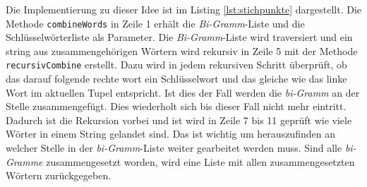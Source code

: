 Die Implementierung zu dieser Idee ist im Listing \ref{lst:stichpunkte} dargestellt. Die Methode \lstinline{combineWords} in Zeile 1 erhält die \emph{Bi-Gramm}-Liste und die Schlüsselwörterliste als Parameter. Die \emph{Bi-Gramm}-Liste wird traversiert und ein string aus zusammengehörigen Wörtern wird rekursiv in Zeile 5 mit der Methode \lstinline{recursivCombine} erstellt. Dazu wird in jedem rekursiven Schritt überprüft, ob das darauf folgende rechte wort ein Schlüsselwort und das gleiche wie das linke Wort im aktuellen Tupel entspricht. Ist dies der Fall werden die \emph{bi-Gramm} an der Stelle zusammengefügt. Dies wiederholt sich bis dieser Fall nicht mehr eintritt. Dadurch ist die Rekursion vorbei und ist wird in Zeile 7 bis 11 geprüft wie viele Wörter in einem String gelandet sind. Das ist wichtig um herauszufinden an welcher Stelle in der \emph{bi-Gramm}-Liste weiter gearbeitet werden muss. Sind alle \emph{bi-Gramme} zusammengesetzt worden, wird eine Liste mit allen zusammengesetzten Wörtern zurückgegeben.
